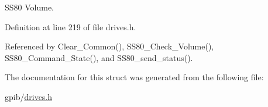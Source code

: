 S\+S80 Volume. 



Definition at line 219 of file drives.\+h.



Referenced by Clear\+\_\+\+Common(), S\+S80\+\_\+\+Check\+\_\+\+Volume(), S\+S80\+\_\+\+Command\+\_\+\+State(), and S\+S80\+\_\+send\+\_\+status().



The documentation for this struct was generated from the following file\+:\begin{DoxyCompactItemize}
\item 
gpib/\hyperlink{drives_8h}{drives.\+h}\end{DoxyCompactItemize}
